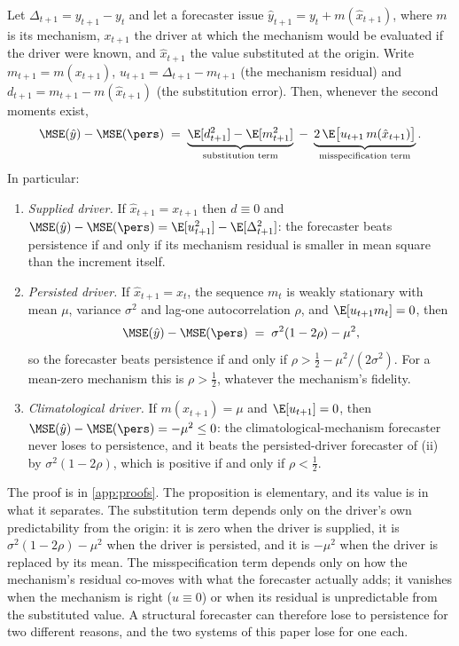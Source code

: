 \begin{proposition}\label{prop:increment}
Let $\Delta_{t+1}=y_{t+1}-y_t$ and let a forecaster issue $\hat y_{t+1}=y_t+m(\hat x_{t+1})$, where $m$ is its mechanism, $x_{t+1}$ the driver at which the mechanism would be evaluated if the driver were known, and $\hat x_{t+1}$ the value substituted at the origin. Write $m_{t+1}=m(x_{t+1})$, $u_{t+1}=\Delta_{t+1}-m_{t+1}$ (the mechanism residual) and $d_{t+1}=m_{t+1}-m(\hat x_{t+1})$ (the substitution error). Then, whenever the second moments exist,
\begin{equation}\label{eq:decomp}
\MSE(\hat y)-\MSE(\pers)\;=\;\underbrace{\E[d_{t+1}^2]-\E[m_{t+1}^2]}_{\text{substitution term}}\;-\;\underbrace{2\,\E\bigl[u_{t+1}\,m(\hat x_{t+1})\bigr]}_{\text{misspecification term}} .
\end{equation}
In particular:
\begin{enumerate}[label=(\roman*),leftmargin=2.2em,itemsep=2pt]
\item \emph{Supplied driver.} If $\hat x_{t+1}=x_{t+1}$ then $d\equiv0$ and $\MSE(\hat y)-\MSE(\pers)=\E[u_{t+1}^2]-\E[\Delta_{t+1}^2]$: the forecaster beats persistence if and only if its mechanism residual is smaller in mean square than the increment itself.
\item \emph{Persisted driver.} If $\hat x_{t+1}=x_t$, the sequence $m_t$ is weakly stationary with mean $\mu$, variance $\sigma^2$ and lag-one autocorrelation $\rho$, and $\E[u_{t+1}m_t]=0$, then
\[\MSE(\hat y)-\MSE(\pers)\;=\;\sigma^2(1-2\rho)-\mu^2,\]
so the forecaster beats persistence if and only if $\rho>\tfrac12-\mu^2/(2\sigma^2)$. For a mean-zero mechanism this is $\rho>\tfrac12$, whatever the mechanism's fidelity.
\item \emph{Climatological driver.} If $m(\hat x_{t+1})=\mu$ and $\E[u_{t+1}]=0$, then $\MSE(\hat y)-\MSE(\pers)=-\mu^2\le0$: the climatological-mechanism forecaster never loses to persistence, and it beats the persisted-driver forecaster of (ii) by $\sigma^2(1-2\rho)$, which is positive if and only if $\rho<\tfrac12$.
\end{enumerate}
\end{proposition}

The proof is in \ref{app:proofs}. The proposition is elementary, and its value is in what it separates. The substitution term depends only on the driver's own predictability from the origin: it is zero when the driver is supplied, it is $\sigma^2(1-2\rho)-\mu^2$ when the driver is persisted, and it is $-\mu^2$ when the driver is replaced by its mean. The misspecification term depends only on how the mechanism's residual co-moves with what the forecaster actually adds; it vanishes when the mechanism is right ($u\equiv0$) or when its residual is unpredictable from the substituted value. A structural forecaster can therefore lose to persistence for two different reasons, and the two systems of this paper lose for one each.

